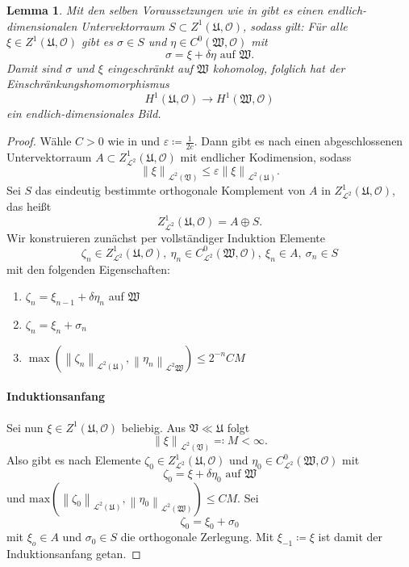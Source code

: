 \documentclass[11pt,a4paper,toc=bibliography]{scrartcl}
\theoremstyle{thm}
\newtheorem{lemma}{Lemma}[section]
\theoremstyle{def}
\theoremstyle{remark}
\newcommand*{\norm}[1]{\left\lVert#1\right\rVert} %
\begin{document}
\begin{lemma}
Mit den selben Voraussetzungen wie in  gibt es einen endlich-
dimensionalen Untervektorraum $S\subset Z^1(\mathfrak{U},\mathcal{O})$, sodass gilt:
Für alle $\xi\in Z^1(\mathfrak{U},\mathcal{O})$ gibt es $\sigma\in S$ und $\eta\in C^0(\mathfrak{W},\mathcal{O})$ mit
\[
\sigma = \xi +\delta\eta\text{ auf } \mathfrak{W}.
\]
Damit sind $\sigma$ und $\xi$ eingeschränkt auf $\mathfrak{W}$ kohomolog, folglich hat der Einschränkungshomomorphismus 
\[
H^1(\mathfrak{U},\mathcal{O})\rightarrow H^1(\mathfrak{W},\mathcal{O})
\]
ein endlich-dimensionales Bild.
\end{lemma}
\begin{proof}

Wähle $C>0$ wie in  und $\varepsilon\coloneqq \frac{1}{2c}$. Dann gibt es nach  einen abgeschlossenen Untervektorraum $A\subset Z^1_{\mathcal{L}^2}(\mathfrak{U},\mathcal{O})$ mit endlicher Kodimension, sodass
\[
\norm{\xi}_{\mathcal{L}^2(\mathfrak{V})}\leq \varepsilon\norm{\xi}_{\mathcal{L}^2(\mathfrak{U})}.
\]
Sei $S$ das eindeutig bestimmte orthogonale Komplement von $A$ in $Z^1_{\mathcal{L}^2}(\mathfrak{U},\mathcal{O})$, das heißt
\[
Z^1_{\mathcal{L}^2}(\mathfrak{U},\mathcal{O}) = A\oplus S.
\]
Wir konstruieren zunächst per vollständiger Induktion Elemente 
\[
\zeta_n\in Z^1_{\mathcal{L}^2}(\mathfrak{U},\mathcal{O}),~\eta_n\in C^0_{\mathcal{L}^2}(\mathfrak{W},\mathcal{O}),~\xi_n\in A, ~\sigma_n\in S
\]
mit den folgenden Eigenschaften:
\begin{enumerate}
\item $\zeta_n = \xi_{n-1}+\delta \eta_n$ auf $\mathfrak{W}$
\item $\zeta_n = \xi_n+\sigma_n$
\item $\max\left(\norm{\zeta_n}_{\mathcal{L}^2(\mathfrak{U})},\norm{\eta_n}_{\mathcal{L}^2{\mathfrak{W}}}\right)\leq 2^{-n}CM$
\end{enumerate}
\paragraph*{Induktionsanfang}
Sei nun $\xi\in Z^1(\mathfrak{U},\mathcal{O})$ beliebig. Aus $\mathfrak{V}\ll \mathfrak{U}$ folgt
\[
\norm{\xi}_{\mathcal{L}^2(\mathfrak{V})}\eqqcolon M <\infty.
\]
Also gibt es nach  Elemente $\zeta_0\in Z^1_{\mathcal{L}^2}(\mathfrak{U},\mathcal{O})$ und $\eta_0\in C^0_{\mathcal{L}^2}(\mathfrak{W},\mathcal{O})$ mit
\[
\zeta_0 = \xi + \delta\eta_0 \text{ auf } \mathfrak{W}
\]
und $\mathrm{max}(\norm{\zeta_0}_{\mathcal{L}^2(\mathfrak{U})},\norm{\eta_0}_{\mathcal{L}^2(\mathfrak{W})})\leq CM.$
Sei
\[
\zeta_0 = \xi_0+\sigma_0
\]
mit $\xi_o\in A$ und $\sigma_0\in S$ die orthogonale Zerlegung.
Mit $\xi_{-1}\coloneqq \xi$ ist damit der Induktionsanfang getan.

\end{proof}
\end{document}
